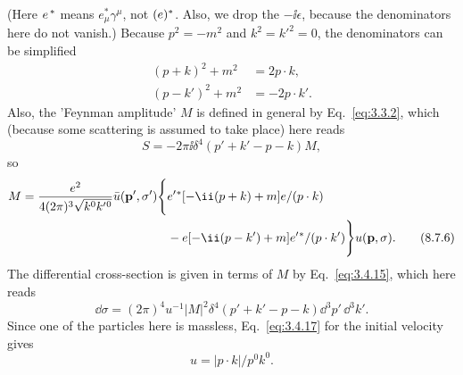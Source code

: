 (Here $\sl{e}^{\,*}$ means $e^*_\mu\gamma^\mu$, not $(\sl{e})^*$.
Also, we drop the $-\ii\epsilon$, because the denominators here do not
vanish.) Because $p^2=-m^2$ and $k^2=k'^2=0$, the denominators can be
simplified
\begin{align}
(p+k)^2+m^2&=2p\cdot k,
\tag{8.7.3}\label{eq:8.7.3}\\
(p-k')^2+m^2&=-2p\cdot k'.
\tag{8.7.4}\label{eq:8.7.4}
\end{align}
Also, the 'Feynman amplitude' $M$ is defined in general by Eq.~\eqref{eq:3.3.2},
which (because some scattering is assumed to take place) here reads
\begin{equation}
S=-2\pi \ii\delta^4(p'+k'-p-k)M,
\tag{8.7.5}\label{eq:8.7.5}
\end{equation}
so
\begin{align}
M={e^2\over4(2\pi)^3\sqrt{k^0k'{}^0}}\bar u(\mathbf p',\sigma')
\Biggl\{&\sl{e'}{}^*[-\ii(\sl{p}+\sl{k})+m]\sl{e}/(p\cdot k)
\notag\\
&-\sl{e}[-\ii(\sl{p}-\sl{k'})+m]\sl{e'}{}^*/(p\cdot k')\Biggr\}
u(\mathbf p,\sigma).
\tag{8.7.6}\label{eq:8.7.6}
\end{align}
The differential cross-section is given in terms of $M$ by Eq.~\eqref{eq:3.4.15},
which here reads
\begin{equation}
\dd\sigma=(2\pi)^4u^{-1}|M|^2\delta^4(p'+k'-p-k)\dd^3p'\,\dd^3k'.
\tag{8.7.7}\label{eq:8.7.7}
\end{equation}
Since one of the particles here is massless, Eq.~\eqref{eq:3.4.17} for the initial
velocity gives
\begin{equation}
u=|p\cdot k|/p^0k^0.
\tag{8.7.8}\label{eq:8.7.8}
\end{equation}

